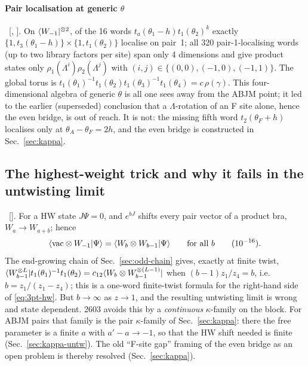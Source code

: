 \paragraph{Pair localisation at generic $\theta$} \npy\ [, ]. On
$\langle W_{-1}|^{\otimes2}$, of the 16 words $t_a(\theta_1-h)t_1(\theta_2)^k$ exactly
$\{1,t_3(\theta_1-h)\}\times\{1,t_1(\theta_2)\}$ localise on pair~1; all 320 pair-1-localising words (up to two library factors per
site) span only 4 dimensions and give product states only $\rho_1(\Lambda^i)\rho_2(\Lambda^j)$ with
$(i,j)\in\{(0,0),(-1,0),(-1,1)\}$. The global torus is
$t_1(\theta_1)^{-1}t_1(\theta_2)t_1(\theta_3)^{-1}t_1(\theta_4)=c\,\rho(\gamma)$. This four-dimensional algebra of generic $\theta$
is all one sees away from the ABJM point; it led to the earlier (superseded) conclusion that a $\Lambda$-rotation of an
F site alone, hence the even bridge, is out of reach. It is not: the missing fifth word $t_2(\theta_F+h)$ localises only at
$\theta_A-\theta_F=2h$, and the even bridge is constructed in Sec.~\ref{sec:kappa}.

\subsection{The highest-weight trick and why it fails in the untwisting limit}\label{sec:3pt-hw}

\npy\ []. For a HW state $J\Psi=0$, and $e^{bJ}$ shifts every pair vector of a product bra, $W_a\to W_{a+b}$; hence
\begin{equation}\label{eq:3pt-hw}
 \langle\mathrm{vac}\otimes W_{-1}|\Psi\rangle=\langle W_b\otimes W_{b-1}|\Psi\rangle\qquad\text{for all }b\qquad(10^{-16}).
\end{equation}
The end-growing chain of Sec.~\ref{sec:odd-chain} gives, exactly at finite twist,
$\langle W_{b-1}^{\otimes L}|t_1(\theta_1)^{-1}t_1(\theta_2)=c_{12}\langle W_b\otimes W_{b-1}^{\otimes(L-1)}|$ when
$(b-1)z_1/z_4=b$, i.e.\ $b=z_1/(z_1-z_4)$; this is a one-word finite-twist formula for the right-hand side
of \eqref{eq:3pt-hw}. But $b\to\infty$ as $z\to1$, and the resulting untwisting limit is wrong and state dependent. 2603 avoids
this by a \emph{continuous} $\kappa$-family on the block. For ABJM pairs that family is the pair $\kappa$-family of
Sec.~\ref{sec:kappa}: there the free parameter is a finite $a$ with $a'-a\to-1$, so that the HW shift needed is finite
(Sec.~\ref{sec:kappa-untw}). The old ``F-site gap'' framing of the even bridge as an open problem is thereby resolved
(Sec.~\ref{sec:kappa}).

